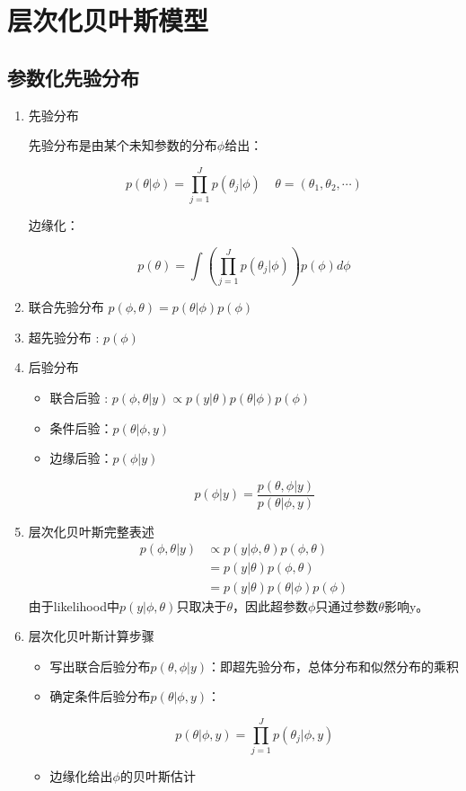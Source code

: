 \section{层次化贝叶斯模型}

\subsection{参数化先验分布}
\begin{enumerate}
\def\labelenumi{\arabic{enumi}.}
\item
  先验分布\cite{gelman_bayesian_2014}

  先验分布是由某个未知参数的分布\(\phi\)给出：

  \[p(\theta|\phi)=\prod_{j=1}^Jp(\theta_j|\phi)\ \ \ \ \  \theta=(\theta_1,\theta_2,\cdots)\]

  边缘化：

  \[p(\theta)=\int\left( \prod_{j=1}^Jp(\theta_j|\phi) \right)p(\phi)d\phi\]
\item
  联合先验分布 \(p(\phi,\theta)=p(\theta|\phi)p(\phi)\)
\item
  超先验分布 : \(p(\phi)\)
\item
  后验分布

  \begin{itemize}
  \item
    联合后验 : \(p(\phi,\theta|y)\propto p(y|\theta)p(\theta|\phi)p(\phi)\)
  \item
    条件后验：\(p(\theta|\phi,y)\)
  \item
    边缘后验：\(p(\phi|y)\)

    \[p(\phi|y)=\frac{p(\theta,\phi|y)}{p(\theta|\phi,y)}\]
  \end{itemize}

\item 层次化贝叶斯完整表述
\begin{equation}
  \begin{aligned}
    p(\phi,\theta|y)
    &\propto p(y|\phi,\theta)p(\phi,\theta)\\
    &=p(y|\theta)p(\phi,\theta)\\
    &=p(y|\theta)p(\theta|\phi)p(\phi)
    \end{aligned}
\end{equation}
由于likelihood中$p(y|\phi,\theta)$只取决于$\theta$，因此超参数$\phi$只通过参数$\theta$影响y。
\item 层次化贝叶斯计算步骤

\begin{itemize}
\item
  写出联合后验分布\(p(\theta,\phi|y)\)：即超先验分布，总体分布和似然分布的乘积
\item
  确定条件后验分布\(p(\theta|\phi,y)\)：

  \[p(\theta|\phi,y)=\prod_{j=1}^J p(\theta_j|\phi,y)\]
\item
  边缘化给出\(\phi\)的贝叶斯估计
\end{itemize}
\end{enumerate}

